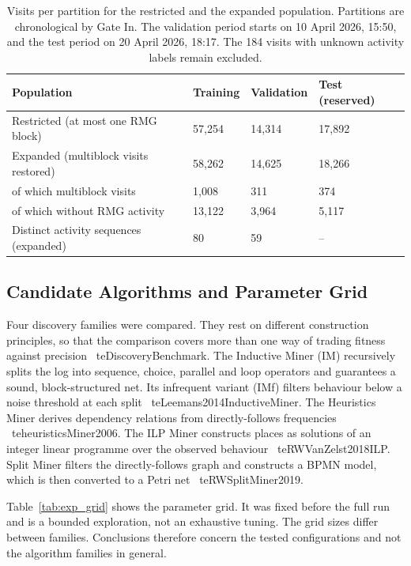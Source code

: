 \begin{table}[htbp]
\centering
\begin{tabularx}{\textwidth}{YL{2.3cm}L{2.3cm}L{2.3cm}}
\toprule
\textbf{Population} & \textbf{Training} & \textbf{Validation} & \textbf{Test (reserved)} \\
\midrule
Restricted (at most one RMG block) & 57,254 & 14,314 & 17,892 \\
Expanded (multiblock visits restored) & 58,262 & 14,625 & 18,266 \\
\quad of which multiblock visits & 1,008 & 311 & 374 \\
\quad of which without RMG activity & 13,122 & 3,964 & 5,117 \\
Distinct activity sequences (expanded) & 80 & 59 & -- \\
\bottomrule
\end{tabularx}
\caption{Visits per partition for the restricted and the expanded
population. Partitions are chronological by Gate In. The validation
period starts on 10 April 2026, 15:50, and the test period on 20 April
2026, 18:17. The 184 visits with unknown activity labels remain excluded.}
\label{tab:exp_population}
\end{table}

\subsection{Candidate Algorithms and Parameter Grid}
\label{sec:exp_candidates}

Four discovery families were compared. They rest on different
construction principles, so that the comparison covers more than one
way of trading fitness against precision
\	te{DiscoveryBenchmark}. The Inductive Miner (IM) recursively
splits the log into sequence, choice, parallel and loop operators and
guarantees a sound, block-structured net. Its infrequent variant (IMf)
filters behaviour below a noise threshold at each split
\	te{Leemans2014InductiveMiner}. The Heuristics Miner derives
dependency relations from directly-follows frequencies
\	te{heuristicsMiner2006}. The ILP Miner constructs places as
solutions of an integer linear programme over the observed behaviour
\	te{RWVanZelst2018ILP}. Split Miner filters the directly-follows
graph and constructs a BPMN model, which is then converted to a Petri net
\	te{RWSplitMiner2019}.

Table~\ref{tab:exp_grid} shows the parameter grid. It was fixed before
the full run and is a bounded exploration, not an exhaustive tuning.
The grid sizes differ between families. Conclusions therefore concern
the tested configurations and not the algorithm families in general.


